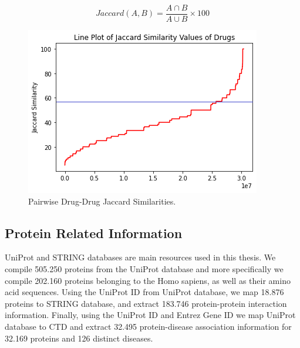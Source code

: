 \begin{equation}
    Jaccard (A, B) = \frac{A \cap  B}{ A \cup B} \times  100
\label{eq:jaccard}
\end{equation}

\begin{figure}
    \centering
        \includegraphics[width=0.5\linewidth]{chapters/materials_and_methods/figures/dds_line.png}
    \caption{Pairwise Drug-Drug Jaccard Similarities.}
    \label{fig:dds}
\end{figure}


\subsection{Protein Related Information}
UniProt and STRING databases are main resources used in this thesis. We compile 505.250 proteins from the UniProt database and more specifically we compile 202.160 proteins belonging to the Homo sapiens, as well as their amino acid sequences. Using the UniProt ID from UniProt database, we map 18.876 proteins to STRING database, and extract 183.746 protein-protein interaction information. Finally, using the UniProt ID and Entrez Gene ID we map UniProt database to CTD and extract 32.495 protein-disease association information for 32.169 proteins and 126 distinct diseases.

